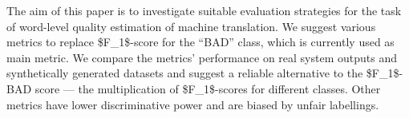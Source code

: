 The aim of this paper is to investigate suitable evaluation strategies for the task of word-level quality estimation of machine translation. We suggest various metrics to replace \$F\_1\$-score for the ``BAD'' class, which is currently used as main metric. We compare the metrics' performance on real system outputs and synthetically generated datasets and suggest a reliable alternative to the \$F\_1\$-BAD score --- the multiplication of \$F\_1\$-scores for different classes. Other metrics have lower discriminative power and are biased by unfair labellings.
